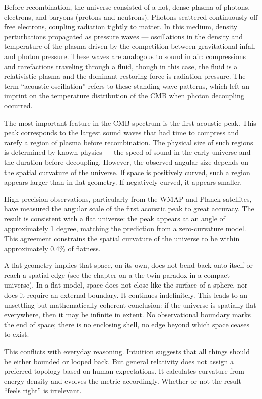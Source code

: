 Before recombination, the universe consisted of a hot, dense plasma of photons, electrons, and baryons (protons and neutrons). Photons scattered continuously off free electrons, coupling radiation tightly to matter. In this medium, density perturbations propagated as pressure waves — oscillations in the density and temperature of the plasma driven by the competition between gravitational infall and photon pressure. These waves are analogous to sound in air: compressions and rarefactions traveling through a fluid, though in this case, the fluid is a relativistic plasma and the dominant restoring force is radiation pressure. The term “acoustic oscillation” refers to these standing wave patterns, which left an imprint on the temperature distribution of the CMB when photon decoupling occurred.

The most important feature in the CMB spectrum is the first acoustic peak. This peak corresponds to the largest sound waves that had time to compress and rarefy a region of plasma before recombination. The physical size of such regions is determined by known physics — the speed of sound in the early universe and the duration before decoupling. However, the observed angular size depends on the spatial curvature of the universe. If space is positively curved, such a region appears larger than in flat geometry. If negatively curved, it appears smaller.

High-precision observations, particularly from the WMAP and Planck satellites, have measured the angular scale of the first acoustic peak to great accuracy. The result is consistent with a flat universe: the peak appears at an angle of approximately 1 degree, matching the prediction from a zero-curvature model. This agreement constrains the spatial curvature of the universe to be within approximately 0.4\% of flatness.

A flat geometry implies that space, on its own, does not bend back onto itself or reach a spatial edge (see the chapter on a the twin paradox in a compact universe). In a flat model, space does not close like the surface of a sphere, nor does it require an external boundary. It continues indefinitely. This leads to an unsettling but mathematically coherent conclusion: if the universe is spatially flat everywhere, then it may be infinite in extent. No observational boundary marks the end of space; there is no enclosing shell, no edge beyond which space ceases to exist.

This conflicts with everyday reasoning. Intuition suggests that all things should be either bounded or looped back. But general relativity does not assign a preferred topology based on human expectations. It calculates curvature from energy density and evolves the metric accordingly. Whether or not the result “feels right” is irrelevant.

